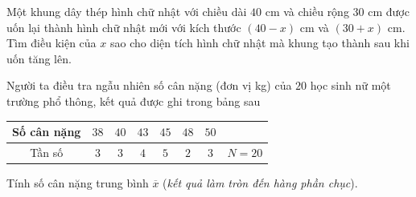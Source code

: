 \begin{ex}%
Một khung dây thép hình chữ nhật với chiều dài $40$ cm và chiều rộng $30$ cm được uốn lại thành hình chữ nhật mới với kích thước $(40-x)$ cm và $(30+x)$ cm. Tìm điều kiện của $x$ sao cho diện tích hình chữ nhật mà khung tạo thành sau khi uốn tăng lên.
\end{ex}

\begin{ex}%
Người ta điều tra ngẫu nhiên số cân nặng (đơn vị kg) của $20$ học sinh nữ một trường phổ thông, kết quả được ghi trong bảng sau
\begin{center}
\begin{tabular}{|c|c|c|c|c|c|c|c|}
\hline Số cân nặng & $38$ & $40$ & $43$ & $45$ & $48$ & $50$ & \\
\hline Tần số & $3$ & $3$ & $4$ & $5$ & $2$ & $3$ & $N=20$ \\
\hline
\end{tabular}
\end{center}
Tính số cân nặng trung bình $\overline{x}$ (\textit{kết quả làm tròn đến hàng phần chục}).
\end{ex}

